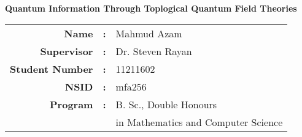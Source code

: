 

\begin{titlepage}

\vspace*{0.15\vsize}

\begin{center}
{\bf\huge Quantum Information Through Toplogical Quantum Field Theories}
\end{center}

\vspace{0.15\vsize}

\begin{center}
\renewcommand{\arraystretch}{1.5}
\begin{tabular}{ r c l }
\textbf{Name}             &\textbf{:}&    Mahmud Azam\\
\textbf{Supervisor}       &\textbf{:}&    Dr. Steven Rayan\\
\textbf{Student Number}   &\textbf{:}&    11211602\\
\textbf{NSID}             &\textbf{:}&    mfa256\\
\textbf{Program}          &\textbf{:}&    B. Sc., Double Honours\\
                          &          &    in Mathematics and Computer Science
\end{tabular}
\renewcommand{\arraystretch}{1}
\end{center}

\end{titlepage}


\thispagestyle{frontstyle}

\tableofcontents



\pagebreak


